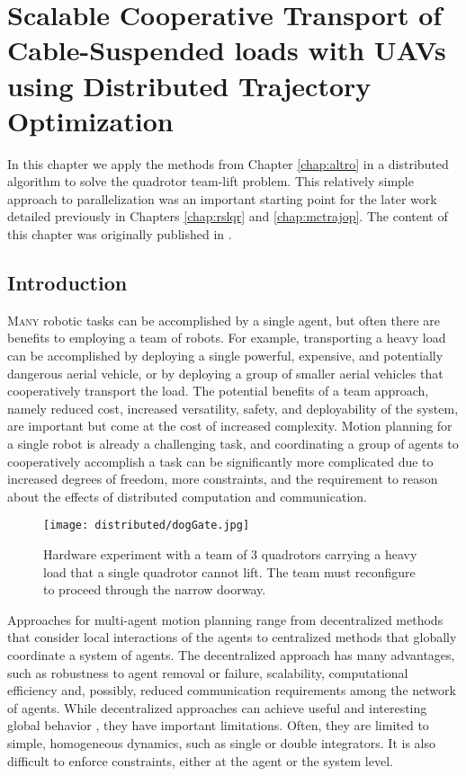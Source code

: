 \documentclass[../root.tex]{subfiles}
\begin{document}
\chapter{
    Scalable Cooperative Transport of Cable-Suspended loads with UAVs using
    Distributed Trajectory Optimization
} \label{chap:distributed}
In this chapter we apply the methods from Chapter \ref{chap:altro} in a
distributed algorithm to solve the quadrotor team-lift problem. This
relatively simple approach to parallelization was an important starting
point for the later work detailed previously in Chapters \ref{chap:rslqr} and 
\ref{chap:mctrajop}. 
The content of this chapter was originally published in 
\cite{jackson_Scalable_2020}.

\section{Introduction}
\lettrine{M}{any} robotic tasks can be accomplished by a single agent,
but often there are benefits to employing a team of robots. For example,
transporting a heavy load can be accomplished by deploying a single powerful,
expensive, and potentially dangerous aerial vehicle, or by deploying a group
of smaller aerial vehicles that cooperatively transport the load. The
potential benefits of a team approach, namely reduced cost, increased
versatility, safety, and deployability of the system, are important but come
at the cost of increased complexity. Motion planning for a single robot is
already a challenging task, and coordinating a group of agents to
cooperatively accomplish a task can be significantly more complicated due to
increased degrees of freedom, more constraints, and the requirement to reason
about the effects of distributed computation and communication.

\begin{figure}[t]
	\centering
	\texttt{[image: distributed/dogGate.jpg]}
	\caption{Hardware experiment with a team of 3 quadrotors carrying a heavy
	load that a single quadrotor cannot lift. The team must reconfigure to
	proceed through the narrow doorway.}
	\label{fig:x0_hardware}
\end{figure}

Approaches for multi-agent motion planning range from decentralized methods
that consider local interactions of the agents to centralized methods that
globally coordinate a system of agents. The decentralized approach has many
advantages, such as robustness to agent removal or failure, scalability,
computational efficiency and, possibly, reduced communication requirements
among the network of agents. While decentralized approaches can achieve
useful and interesting global behavior 
\cite{cortes_Coverage_2004,krick_Stabilisation_2009,olfati-saber_Consensus_2004,
pimenta_Sensing_2008,vandenberg_Reciprocal_2008},
they have important limitations. Often, they are limited
to simple, homogeneous dynamics, such as single or double integrators. It is
also difficult to enforce constraints, either at the agent or the system
level.
\end{document}
